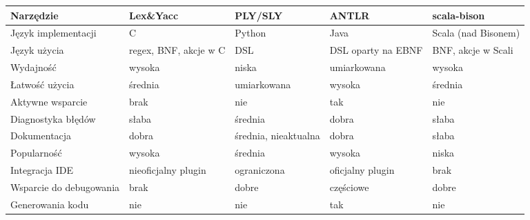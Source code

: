 \begin{table}[ht]
    \centering
    \begin{tabular}{L|CCCC}
        \toprule
        \large{Narzędzie}       & \textbf{Lex\&Yacc}                        & \textbf{PLY/SLY}     & \textbf{ANTLR}     & \textbf{scala-bison} \\
        \midrule
        Język implementacji     & C                                         & Python               & Java               & Scala (nad Bisonem)  \\
        \hline
        Język użycia            & regex, BNF, akcje w C                     & DSL                  & DSL oparty na EBNF & BNF, akcje w Scali   \\
        \hline
        Wydajność               & wysoka                                    & niska                & umiarkowana        & wysoka               \\
        \hline
        Łatwość użycia          & średnia                                   & umiarkowana          & wysoka             & średnia              \\
        \hline
        Aktywne wsparcie        & brak                                      & nie                  & tak                & nie                  \\
        \hline
        Diagnostyka błędów      & słaba                                     & średnia              & dobra              & słaba                \\
        \hline
        Dokumentacja            & dobra                                     & średnia, nieaktualna & dobra              & słaba                \\
        \hline
        Popularność             & wysoka                                    & średnia              & wysoka             & niska                \\
        \hline
        Integracja IDE          & nieoficjalny plugin                       & ograniczona          & oficjalny plugin   & brak                 \\
        \hline
        Wsparcie do debugowania & brak                                      & dobre                & częściowe          & dobre                \\
        \hline
        Generowania kodu        & nie                                       & nie                  & tak                & nie                  \\

\end{tabular}
\end{table}
